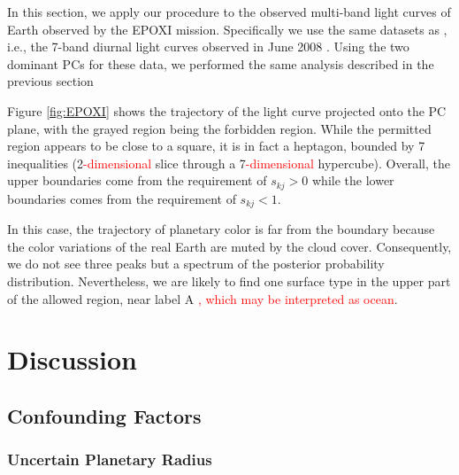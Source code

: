 \documentclass[iop,numberedappendix,apj]{emulateapj}
\def\edit#1{\textcolor{red}{#1}}
\begin{document}



In this section, we apply our procedure to the observed multi-band light curves of Earth observed by the EPOXI mission. 
Specifically we use the same datasets as \citet{Cowan2013}, i.e., the 7-band diurnal light curves observed in June 2008 \citep{Livengood2011}. 
Using the two dominant PCs for these data, we performed the same analysis described in the previous section 

Figure \ref{fig:EPOXI} shows the trajectory of the light curve projected onto the PC plane, with the grayed region being the forbidden region. 
While the permitted region appears to be close to a square, it is in fact a heptagon, bounded by 7 inequalities (2\edit{-dimensional} slice through a 7\edit{-dimensional} hypercube). 
Overall, the upper boundaries come from the requirement of $s_{kj}>0$ while the lower boundaries comes from the requirement of $s_{kj}<1$. 

In this case, the trajectory of planetary color is far from the boundary because the color variations of the real Earth are muted by the cloud cover. 
Consequently, we do not see three peaks but a spectrum of the posterior probability distribution. 
Nevertheless, we are likely to find one surface type in the upper part of the allowed region, near label A \edit{, which may be interpreted as ocean}. 


\section{Discussion}
\label{s:discussion}

\subsection{Confounding Factors}
\label{ss:confonting_factors}


\subsubsection{Uncertain Planetary Radius}

\end{document}

